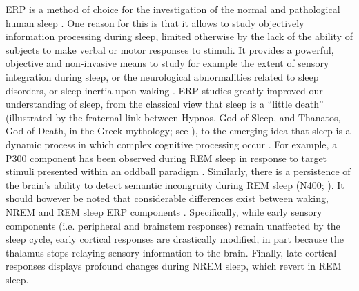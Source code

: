 ERP is a method of choice for the investigation of the normal and pathological human sleep \citep{bastuji_evoked_1999, colrain_use_2007}. One reason for this is that it allows to study objectively information processing during sleep, limited otherwise by the lack of the ability of subjects to make verbal or motor responses to stimuli. It provides a powerful, objective and non-invasive means to study for example the extent of sensory integration during sleep, or the neurological abnormalities related to sleep disorders, or sleep inertia upon waking \citep{bastuji_event-related_2003}.
ERP studies greatly improved our understanding of sleep, from the classical view that sleep is a “little death” (illustrated by the fraternal link between Hypnos, God of Sleep, and Thanatos, God of Death, in the Greek mythology; see \citealp{mazza_asleep_2014}), to the emerging idea that sleep is a dynamic process in which complex cognitive processing occur \citep{andrillon_sleeping_2016}. For example, a P300 component has been observed during REM sleep in response to target stimuli presented within an oddball paradigm \citep{bastuji_brain_1995}. Similarly, there is a persistence of the brain’s ability to detect semantic incongruity during REM sleep  (N400; \citealp{perrin_detection_2002}).
It should however be noted that considerable differences exist between waking, NREM and REM sleep ERP components \citep{bastuji_evoked_1999, colrain_use_2007}. Specifically, while early sensory components (i.e. peripheral and brainstem responses) remain unaffected by the sleep cycle, early cortical responses are drastically modified, in part because the thalamus stops relaying sensory information to the brain. Finally, late cortical responses displays profound changes during NREM sleep, which revert in REM sleep.
